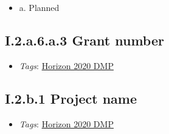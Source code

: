 \documentclass[a4paper,12pt]{report}
\begin{document}
\begin{itemize}
  \item[\CheckmarkBold] a. Planned
\end{itemize}





\subsection*{\protect\textcolor{colorSecId}{I.2.a.6.a.3} Grant number}

\label{1e85da40-bbfc-4180-903e-6c569ed2da38.c3dabaaf-c946-4a0d-889c-ede966f97667.01fb6972-a748-47d6-9974-6cfa59b4b156.36a87eac-402d-43fb-a0df-ac5963bdf87d.56b169cb-bda4-40ea-a0a3-91dacaec41d5.1ccbd0bb-4263-4240-9dc5-936ef09eef53}


\begin{itemize}
  \item \textit{Tags}: \ul{Horizon 2020 DMP}
  \end{itemize}







\subsection*{\protect\textcolor{colorSecId}{I.2.b.1} Project name}

\label{1e85da40-bbfc-4180-903e-6c569ed2da38.c3dabaaf-c946-4a0d-889c-ede966f97667.afc53854-30c4-4236-a5be-7e49ad186b95.f0ef08fd-d733-465c-bc66-5de0b826c41b}


\begin{itemize}
  \item \textit{Tags}: \ul{Horizon 2020 DMP}
  \end{itemize}
\end{document}
